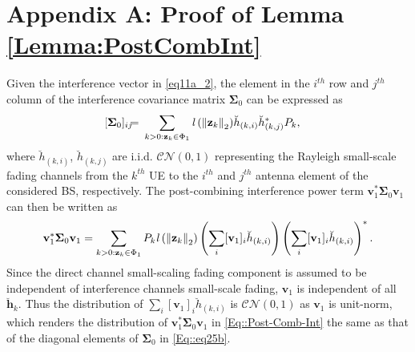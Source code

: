 \documentclass[12pt, draftclsnofoot, onecolumn]{IEEEtran}
\theoremstyle{plain}
\begin{document}
{\color{black}
\vspace{-.15in}
\section*{Appendix A: Proof of Lemma \ref{Lemma:PostCombInt}}\label{APPx::1}\vspace{-.05in}
Given the interference vector in \eqref{eq11a_2}, the element in the $i^{th}$ row and $j^{th}$ column of the interference covariance matrix $\boldsymbol{\Sigma}_{0}$ can be expressed as \vspace{-.05in}
\begin{eqnarray}
\!\!\!\!\!\![\boldsymbol{\Sigma}_{0}]_{ij}&\!\!\!=&\!\!\!\sum_{k>0:\bold{z}_k\in \Phi_1} {\mathit{l}\left({\Vert \bold{z}_k \Vert}_2\right)}  \breve{h}_{(k,i)} \breve{h}_{(k,j)}^\ast P_{k},\label{Eq::eq25b}
\end{eqnarray}
where $\breve{h}_{(k,i)}$, $\breve{h}_{(k,j)}$ are i.i.d. $\mathcal{CN}(0,1)$ representing the Rayleigh small-scale fading channels from the $k^{th}$ UE to the $i^{th}$ and $j^{th}$ antenna element of the considered BS, respectively. The post-combining interference power term $\mathbf{v}_1^\ast \boldsymbol{\Sigma}_{0} \mathbf{v}_1$ can then be written as \vspace{-.05in}
\begin{eqnarray}\label{Eq::Post-Comb-Int}
\mathbf{v}_1^\ast \boldsymbol{\Sigma}_{0} \mathbf{v}_1 = \sum_{k>0:\bold{z}_k\in \Phi_1} P_{k} {\mathit{l}\left({\Vert \bold{z}_k \Vert}_2\right)}  \left(\sum_i [\mathbf{v}_1]_i \breve{h}_{(k,i)} \right) \left(\sum_i [\mathbf{v}_1]_i \breve{h}_{(k,i)} \right)^\ast.
\end{eqnarray}
Since the direct channel small-scaling fading component is assumed to be independent of interference channels small-scale fading, $\mathbf{v}_1$ is independent of all $\mathbf{\breve{h}}_{k}$. Thus the distribution of $\sum_i [\mathbf{v}_1]_i \breve{h}_{(k,i)}$ is %
 $\mathcal{CN}(0,1)$ as $\mathbf{v}_1$ is unit-norm, which renders the distribution of $\mathbf{v}_1^\ast \boldsymbol{\Sigma}_{0} \mathbf{v}_1$ in \eqref{Eq::Post-Comb-Int} the same as that of the diagonal elements of $\boldsymbol{\Sigma}_{0}$ in \eqref{Eq::eq25b}.
}
\vspace{-.15in}
\end{document}
